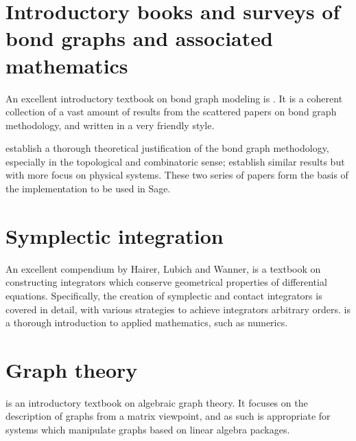 \documentclass[utf8,a4paper,12pt]{report}
\begin{document}
\section{Introductory books and surveys of bond graphs and associated mathematics}
An excellent introductory textbook on bond graph modeling is \cite{Borutzky2010}. It is a coherent collection of a vast amount of results from the scattered papers on bond graph methodology, and written in a very friendly style.

\cite{Birkett1989,Birkett1989a,Birkett1990,Birkett1990a,Birkett2002,Birkett2002a} establish a thorough theoretical justification of the bond graph methodology, especially in the topological and combinatoric sense; \cite{Lamb1997b,Lamb1997,Lamb1997a} establish similar results but with more focus on physical systems. These two series of papers form the basis of the implementation to be used in Sage.
\section{Symplectic integration}
An excellent compendium by Hairer, Lubich and Wanner, \cite{Hairer} is a textbook on constructing integrators which conserve geometrical properties of differential equations. Specifically, the creation of symplectic and contact integrators is covered in detail, with various strategies to achieve integrators arbitrary orders. \cite{Holmes2009} is a thorough introduction to applied mathematics, such as numerics.
\section{Graph theory}
\cite{Knauer2011} is an introductory textbook on algebraic graph theory. It focuses on the description of graphs from a matrix viewpoint, and as such is appropriate for systems which manipulate graphs based on linear algebra packages.



\nocite{*}
\end{document}
